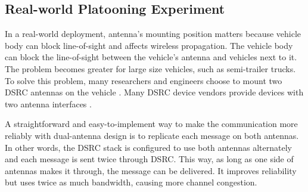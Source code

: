 \documentclass[12pt]{report}
\begin{document}
\subsection{Real-world Platooning Experiment}

In a real-world deployment, antenna's mounting position matters because vehicle body can block line-of-sight and affects wireless propagation. The vehicle body can block the line-of-sight between the vehicle's antenna and vehicles next to it. The problem becomes greater for large size vehicles, such as semi-trailer trucks. To solve this problem, many researchers and engineers choose to mount two DSRC antennas on the vehicle \cite{Bergenhem20121222,peloton}. Many DSRC device vendors provide devices with two antenna interfaces \cite{aradasystems,denso,unex}.

A straightforward and easy-to-implement way to make the communication more reliably with dual-antenna design is to replicate each message on both antennas. In other words, the DSRC stack is configured to use both antennas alternately and each message is sent twice through DSRC. This way, as long as one side of antennas makes it through, the message can be delivered. It improves reliability but uses twice as much bandwidth, causing more channel congestion.
\end{document}
